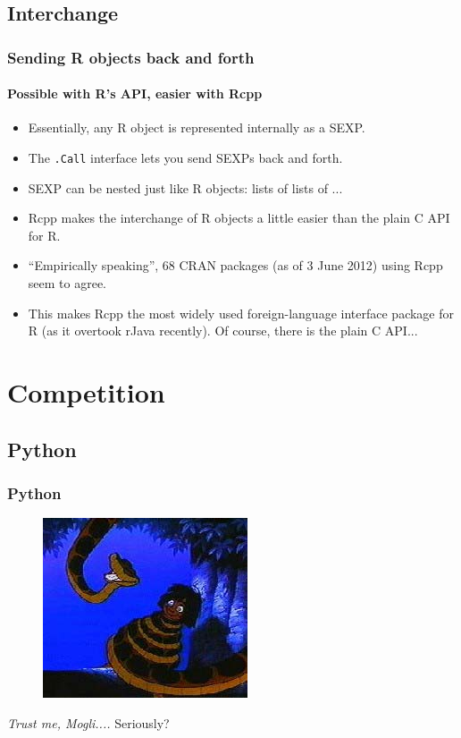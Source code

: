\documentclass[dvipsnames,compress,pdflatex,beamer]{beamer}
\begin{document}
\subsection{Interchange}
\begin{frame}
  \frametitle{Sending R objects back and forth}
  \framesubtitle{Possible with R's API, easier with Rcpp}
  \begin{itemize}[<+->]
  \item Essentially, any R object is represented internally as a SEXP.
  \item The \texttt{.Call} interface lets you send SEXPs back and forth.
  \item SEXP can be nested just like R objects: lists of lists of ...
  \item Rcpp makes the interchange of R objects a little easier than the
    plain C API for R. 
  \item ``Empirically speaking'', 68 CRAN packages (as
    of 3 June 2012) using Rcpp seem to agree.
  \item This makes Rcpp the most widely used foreign-language interface
    package for R (as it overtook rJava recently). Of course, there is the
    plain C API...
  \end{itemize}
\end{frame}

\section{Competition}

\subsection{Python}
\begin{frame}
  \frametitle{Python}
  \pause

  \begin{figure}
    \includegraphics[scale=0.8]{images/Mowglikaa2.jpg}
  \end{figure}

  \medskip

  \emph{Trust me, Mogli....}   Seriously?
\end{frame}
\end{document}
